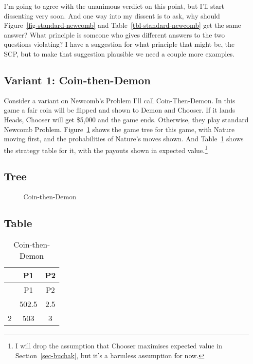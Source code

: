 \documentclass[
  10pt,
  letterpaper,
  DIV=11,
  numbers=noendperiod,
  twoside]{scrartcl}
\begin{document}
I'm going to agree with the unanimous verdict on this point, but I'll
start dissenting very soon. And one way into my dissent is to ask, why
should Figure~\ref{fig-standard-newcomb} and
Table~\ref{tbl-standard-newcomb} get the same answer? What principle is
someone who gives different answers to the two questions violating? I
have a suggestion for what principle that might be, the SCP, but to make
that suggestion plausible we need a couple more examples.

\subsection{Variant 1: Coin-then-Demon}\label{variant-1-coin-then-demon}

Consider a variant on Newcomb's Problem I'll call Coin-Then-Demon. In
this game a fair coin will be flipped and shown to Demon and Chooser. If
it lands Heads, Chooser will get \$5,000 and the game ends. Otherwise,
they play standard Newcomb Problem. Figure~\ref{fig-coin-then-demon}
shows the game tree for this game, with Nature moving first, and the
probabilities of Nature's moves shown. And
Table~\ref{tbl-coin-then-demon} shows the strategy table for it, with
the payouts shown in expected value.\footnote{I will drop the assumption
  that Chooser maximises expected value in Section~\ref{sec-buchak}, but
  it's a harmless assumption for now.}

\subsection{Tree}

\begin{figure}


\caption{\label{fig-coin-then-demon}Coin-then-Demon}

\end{figure}%

\subsection{Table}

\begin{longtable}[]{@{}ccc@{}}
\caption{Coin-then-Demon}\label{tbl-coin-then-demon}\tabularnewline
\toprule\noalign{}
& P1 & P2 \\
\midrule\noalign{}
\endfirsthead
\toprule\noalign{}
& P1 & P2 \\
\midrule\noalign{}
\endhead
\bottomrule\noalign{}
\endlastfoot
1 & 502.5 & 2.5 \\
2 & 503 & 3 \\
\end{longtable}
\end{document}
